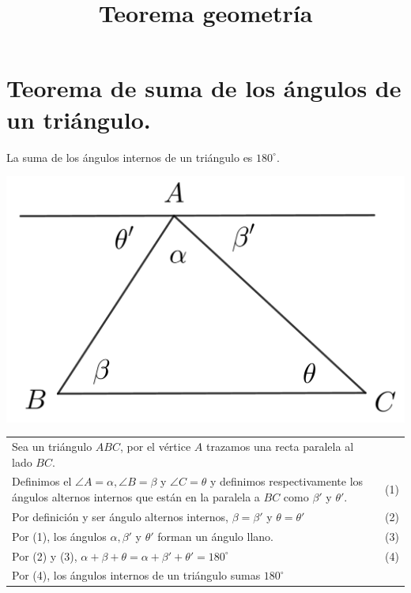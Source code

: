\documentclass[12pt,a4paper, oneside]{book}
\title{Teorema geometría}
\begin{document}
\sffamily
\begin{figure}
\end{figure}
\cfoot{}
\section{Teorema de suma de los ángulos de un triángulo.} 
La suma de los ángulos internos de un triángulo es $180^\circ$.
\\
\begin{center}
\includegraphics[scale=0.7]{Imagenes/demo1.png}
\end{center}
\begin{tabular}{p{15.9cm} p{1cm}}
Sea un triángulo $ABC$, por el vértice $A$ trazamos una recta paralela al lado $BC$. 
\\Definimos el $\angle A=\alpha, \angle B=\beta$ y $\angle C= \theta$ y definimos respectivamente los  ángulos alternos internos que están en la paralela a $BC$ como $\beta '$ y $\theta '$. & \medskip (1)
\\Por definición y ser ángulo alternos internos, $\beta= \beta '$ y $\theta=\theta '$ &(2)
\\Por (1), los ángulos $\alpha,\beta'$ y $\theta'$ forman un ángulo llano. & (3)
\\Por (2) y (3), $\alpha + \beta+ \theta = \alpha + \beta '+ \theta ' = 180^ \circ$ &(4)
\\Por (4), los  ángulos internos de un triángulo sumas $180^\circ$
\end{tabular}
\end{document}
